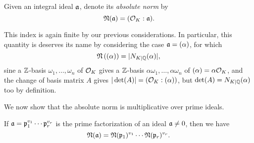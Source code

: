 Given an integral ideal $\mathfrak{a}$, denote its \emph{absolute norm} by
\[
	\mathfrak{N}(\mathfrak{a}) = (\mathcal{O}_K:\mathfrak{a}).
\]

This index is again finite by our previous considerations. In particular, this quantity is deserves its name by considering the case $\mathfrak{a}=(\alpha)$, for which
\[
	\mathfrak{N}\left((\alpha)\right) = |N_{K\mid\mathbb{Q}}(\alpha)|,
\]
sine a $\mathbb{Z}$-basis $\omega_1,\dots,\omega_n$ of $\mathcal{O}_K$ gives a $\mathbb{Z}$-basis $\alpha\omega_1,\dots,\alpha\omega_n$ of $(\alpha)=\alpha\mathcal{O}_K$, and the change of basis matrix $A$ gives $|\det(A)|=(\mathcal{O}_K:(\alpha))$, but $\det(A)=N_{K\mid\mathbb{Q}}(\alpha)$ too by definition.

We now show that the absolute norm is multiplicative over prime ideals.

\begin{prop}
	If $\mathfrak{a}=\mathfrak{p}_1^{v_1}\cdots\mathfrak{p}_r^{v_r}$ is the prime factorization of an ideal $\mathfrak{a}\neq 0$, then we have
	\[
		\mathfrak{N}(\mathfrak{a}) = \mathfrak{N}(\mathfrak{p}_1)^{v_1}\cdots\mathfrak{N}(\mathfrak{p}_r)^{v_r}.
	\]
\end{prop}
